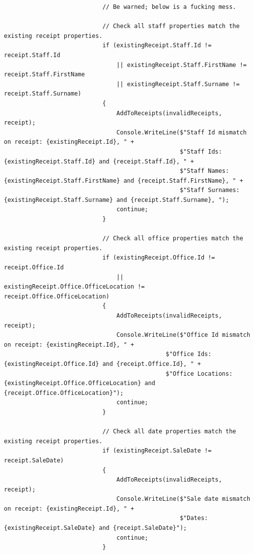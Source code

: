 \documentclass{article}
\begin{document}
\begin{lstlisting}
                            // Be warned; below is a fucking mess.

                            // Check all staff properties match the existing receipt properties.
                            if (existingReceipt.Staff.Id != receipt.Staff.Id
                                || existingReceipt.Staff.FirstName != receipt.Staff.FirstName
                                || existingReceipt.Staff.Surname != receipt.Staff.Surname)
                            {
                                AddToReceipts(invalidReceipts, receipt);
                                Console.WriteLine($"Staff Id mismatch on receipt: {existingReceipt.Id}, " +
                                                  $"Staff Ids: {existingReceipt.Staff.Id} and {receipt.Staff.Id}, " +
                                                  $"Staff Names: {existingReceipt.Staff.FirstName} and {receipt.Staff.FirstName}, " +
                                                  $"Staff Surnames: {existingReceipt.Staff.Surname} and {receipt.Staff.Surname}, ");
                                continue;
                            }

                            // Check all office properties match the existing receipt properties.
                            if (existingReceipt.Office.Id != receipt.Office.Id
                                || existingReceipt.Office.OfficeLocation != receipt.Office.OfficeLocation)
                            {
                                AddToReceipts(invalidReceipts, receipt);
                                Console.WriteLine($"Office Id mismatch on receipt: {existingReceipt.Id}, " +
                                              $"Office Ids: {existingReceipt.Office.Id} and {receipt.Office.Id}, " +
                                              $"Office Locations: {existingReceipt.Office.OfficeLocation} and {receipt.Office.OfficeLocation}");
                                continue;
                            }

                            // Check all date properties match the existing receipt properties.
                            if (existingReceipt.SaleDate != receipt.SaleDate)
                            {
                                AddToReceipts(invalidReceipts, receipt);
                                Console.WriteLine($"Sale date mismatch on receipt: {existingReceipt.Id}, " +
                                                  $"Dates: {existingReceipt.SaleDate} and {receipt.SaleDate}");
                                continue;
                            }












\end{lstlisting}
\end{document}
